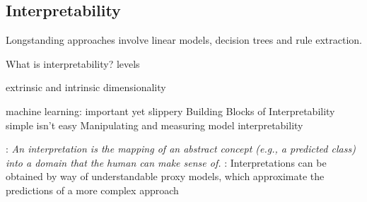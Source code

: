 \documentclass{article}
\newcommand{\ascomment}[1]{\textcolor{ascolor}{(#1)}}
\theoremstyle{definition} \newtheorem{definition}{Definition}  \newtheorem{example}{Example}
\theoremstyle{remark} \newtheorem{remark}{Remark}
\newcommand{\reals}{\mathbb{R}}
\newcounter{ct}
\begin{document}




\subsection{Interpretability}
Longstanding approaches involve linear models, decision trees and rule extraction.

What is interpretability? \citep{erasmus2021interpretability}
\citep{madsen2024interpretability}
levels \citep{hochstein2022levels}

\citep{whiteway2019interpretable}
\citep{kar2022interpretability}
extrinsic and intrinsic dimensionality\citep{jazayeri2021interpreting}

 machine learning: important yet slippery\citep{lipton2018mythos}	
 Building Blocks of Interpretability \citep{olah2018interpretability}
\citep{beisbart2022interpretability}
simple isn't easy \citep{raz2024ml}
Manipulating and measuring model interpretability\citep{poursabzi2021manipulating} %
\citep{he2024multilevel}

\citep{montavon2018methods}: \emph{An interpretation is the mapping of an abstract concept (e.g., a predicted class) into a domain that the human can make sense of.}
%
\citep{ehrhardt2017learning, guidotti2018survey}: Interpretations can be obtained by way of understandable proxy models, which approximate the predictions of a more complex approach
\end{document}
